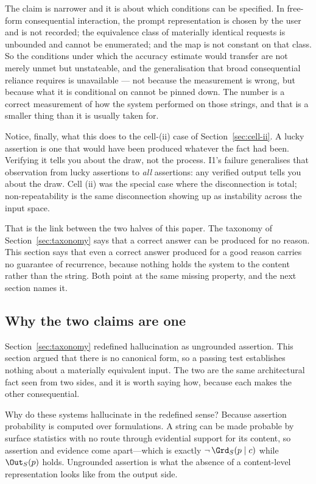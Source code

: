 The claim is narrower and it is about which conditions can be specified. In free-form
consequential interaction, the prompt representation is chosen by the user and is not
recorded; the equivalence class of materially identical requests is unbounded and cannot
be enumerated; and the map is not constant on that class. So the conditions under which
the accuracy estimate would transfer are not merely unmet but unstateable, and the
generalisation that broad consequential reliance requires is unavailable --- not because
the measurement is wrong, but because what it is conditional on cannot be pinned down.
The number is a correct measurement of how the system performed on those strings, and
that is a smaller thing than it is usually taken for.

Notice, finally, what this does to the cell-(ii) case of
Section~\ref{sec:cell-ii}. A lucky assertion is one that would have been produced
whatever the fact had been. Verifying it tells you about the draw, not the
process. I1's failure generalises that observation from lucky assertions to
\emph{all} assertions: any verified output tells you about the draw. Cell (ii) was
the special case where the disconnection is total; non-repeatability is the same
disconnection showing up as instability across the input space.

That is the link between the two halves of this paper. The taxonomy of
Section~\ref{sec:taxonomy} says that a correct answer can be produced for no
reason. This section says that even a correct answer produced for a good reason
carries no guarantee of recurrence, because nothing holds the system to the
content rather than the string. Both point at the same missing property, and the
next section names it.

\subsection{Why the two claims are one}
\label{sec:unity}

Section~\ref{sec:taxonomy} redefined hallucination as ungrounded assertion. This
section argued that there is no canonical form, so a passing test establishes
nothing about a materially equivalent input. The two are the same architectural
fact seen from two sides, and it is worth saying how, because each makes the other
consequential.

Why do these systems hallucinate in the redefined sense? Because assertion
probability is computed over formulations. A string can be made probable by surface
statistics with no route through evidential support for its content, so assertion
and evidence come apart---which is exactly $\neg\,\Grd_S(p \mid c)$ while
$\Out_S(p)$ holds. Ungrounded assertion is what the absence of a content-level
representation looks like from the output side.

